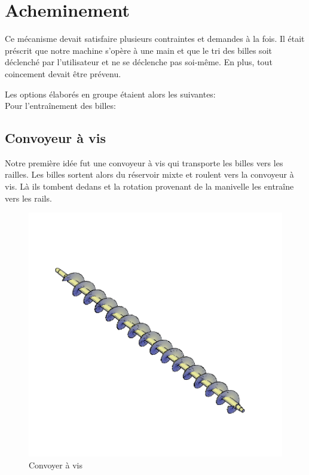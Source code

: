 
\section{Acheminement}
Ce mécanisme devait satisfaire plusieurs contraintes et demandes à la fois. Il était préscrit que notre machine s'opère à une main et que le tri des billes soit déclenché par l'utilisateur et ne se déclenche pas soi-même. En plus, tout coincement devait être prévenu.

Les options élaborés en groupe étaient alors les suivantes:\\
Pour l'entraînement des billes:

\subsection{Convoyeur à vis}
Notre première idée fut une convoyeur à vis qui transporte les billes vers les railles. Les billes sortent alors du réservoir mixte et roulent vers la convoyeur à vis. Là ils tombent dedans et la rotation provenant de la manivelle les entraîne vers les rails.

\begin{figure}
    \centering
    \includegraphics[width=\textwidth]{Graphics/Images_concepts_Leon/795-Screw_conveyor.png}
    \caption{Convoyer à vis}
\end{figure}

